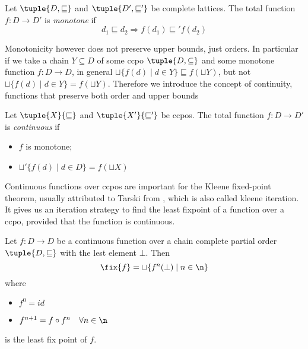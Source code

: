 \begin{definition}
  Let \(\tuple{D, \sqsubseteq}\) and \(\tuple{D', \sqsubseteq'}\) be
  complete lattices. The total function \(f : D \to D'\) is
  \emph{monotone} if
  \begin{equation*}
    d_1 \sqsubseteq d_2 \Rightarrow f(d_1) \sqsubseteq' f(d_2)
  \end{equation*}
\end{definition}


Monotonicity however does not preserve upper bounds, just orders. In
particular if we take a chain \(Y \subseteq D\) of some ccpo
\(\tuple{D, \subseteq}\) and some monotone function \(f : D \to D\),
in general \(\sqcup\{f(d) \mid d \in Y\} \sqsubseteq f(\sqcup Y)\),
but not \(\sqcup\{f(d) \mid d \in Y\} = f(\sqcup Y)\). Therefore we
introduce the concept of continuity, functions that preserve both
order and upper bounds

\begin{definition}
  Let \(\tuple{X}{\sqsubseteq}\) and \(\tuple{X'}{\sqsubseteq'}\) be
  ccpos. The total function \(f : D \to D'\) is \emph{continuous} if
  \begin{itemize}
  \item \(f\) is monotone;
  \item \(\sqcup'\{f(d) \mid d \in D\} = f(\sqcup X)\)
  \end{itemize}
\end{definition}

Continuous functions over ccpos are important for the Kleene
fixed-point theorem, usually attributed to Tarski from
\cite{tarski1955lattice}, which is also called kleene iteration. It
gives us an iteration strategy to find the least fixpoint of a
function over a ccpo, provided that the function is continuous.

\begin{theorem}\label{th:fixpoint}
  Let \(f : D \to D\) be a continuous function over a chain complete
  partial order \(\tuple{D , \sqsubseteq}\) with the lest element
  \(\bot\). Then
  \begin{equation*}
    \fix{f} = \sqcup\{f^n(\bot) \mid n \in \n\}
  \end{equation*}
  where
  \begin{itemize}
  \item \(f^0 = id\)
  \item \(f^{n+1} = f \circ f^n \quad \forall n \in \n\)
  \end{itemize}
  is the least fix point of \(f\).
\end{theorem}